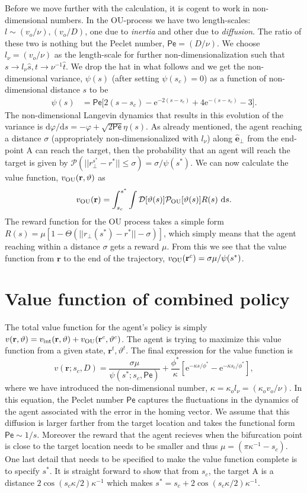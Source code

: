 \documentclass[%
reprint,
superscriptaddress,
floatfix,
amsmath,
amssymb,
aps,
notitlepage
]{revtex4-1}
\def\d{\text{d}}
\def\e{\text{e}}
\def\r{\mathbf{r}}
\def\P{\mathcal{P}}
\def\D{\mathcal{D}}
\def\theta{\vartheta}
\def\ebh{\hat{\mathbf{e}}}
\def\Pe{\mathsf{Pe}}
\begin{document}
Before we move further with the calculation, it is cogent to work in non-dimensional numbers. In the OU-process
we have two length-scales: $l \sim (v_o/\nu), (v_o/D)$, one due to \textit{inertia} and other due to \textit{diffusion}.
The ratio of these two is nothing but the Peclet number, $\Pe = (D/\nu)$. We choose $l_\nu = (v_o/\nu)$ as the length-scale
for further non-dimensionalization such that $s \rightarrow l_\nu \hat{s}, t \rightarrow \nu^{-1} \hat{t}$. We drop the hat in what follows and we get
the non-dimensional variance, $\psi(s)$ (after setting $\psi(s_c) =0$) as a function of non-dimensional distance $s$ to be
\begin{align}
    \psi(s)& = \Pe \bigg[ 2 (s-s_c) - \e^{-2 (s-s_c)} + 4 \e^{-(s-s_c)} - 3 \bigg].
\end{align}
The non-dimensional Langevin dynamics that results in this evolution of the variance is $\d \varphi/\d s = - \varphi + \sqrt{2 \Pe} \eta(s)$.
As already mentioned, the agent reaching a distance $\sigma$ (appropriately non-dimensionalized with $l_\nu$) along $\ebh_\perp$ from the end-point A
can reach the target, then the probability that an agent will reach the target is given by $\P(||r_\perp^{s^*} - r^*|| \leq \sigma)
= \sigma/\psi(s^*)$. We can now calculate the value function, $v_{\rm OU}(\r, \theta)$ as
\[
    v_{\rm OU}(\r) = \int_{s_c}^{s^*} \int \D[\theta(s)] \P_{\rm OU}[\theta(s)] R(s) \ \d s.
\]
The reward function for the OU process takes a simple form $R(s) = \mu[1 - \Theta(||r_\perp(s^*) - r^*|| - \sigma)]$,
which simply means that the agent reaching within a distance $\sigma$ gets a reward $\mu$.
From this we see that the value function from $\r$ to the end of the trajectory, $v_{\rm OU}(\r^c) = \sigma \mu/\psi(s^*)$.

\section*{Value function of combined policy}
The total value function for the agent's policy is simply $v(\r, \theta) = v_{\rm int}(\r, \theta) + v_{\rm OU}(\r^c, \theta^c)$.
The agent is trying to maximize this value function from a given state, $\r^t, \theta^t$. The final expression
for the value function is
\[
    v(\r; s_c, D) = \frac{\sigma \mu}{\psi(s^*; s_c, \Pe)} + \frac{\phi^*}{\kappa} [ \e^{-\kappa s/\phi^*} - \e^{-\kappa s_c/\phi^*}],
\]
where we have introduced the non-dimensional number, $\kappa = \kappa_o l_\nu = (\kappa_o v_o/\nu)$.
In this equation, the Peclet number $\Pe$ captures the fluctuations in the dynamics of the agent
associated with the error in the homing vector. We assume that this diffusion is larger farther
from the target location and takes the functional form $\Pe \sim 1/s$. Moreover the reward that the agent recieves
when the bifurcation point is close to the target location needs to be smaller and thus $\mu = (\pi\kappa^{-1} -s_c)$.
One last detail that needs to be specified to make the value function complete is to specify $s^*$. It is straight
forward to show that from $s_c$, the target A is a distance $2 \cos(s_c\kappa/2)\kappa^{-1}$ which makes
$s^* = s_c + 2 \cos(s_c\kappa/2)\kappa^{-1}$.
\end{document}
